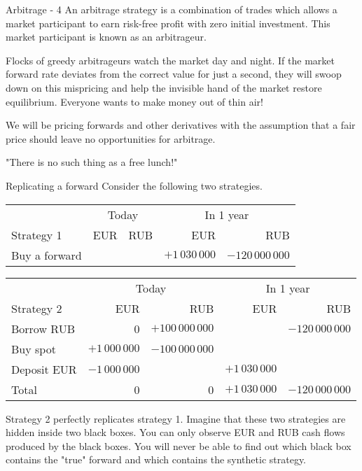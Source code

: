 \documentclass{beamer}
\begin{document}
\begin{frame}{Arbitrage - 4}
\justify
An \alert{arbitrage strategy} is a combination of trades which allows a market participant to earn risk-free profit with zero initial investment. This market participant is known as an \alert{arbitrageur}.

\justify
Flocks of greedy arbitrageurs watch the market day and night. If the market forward rate deviates from the correct value for just a second, they will swoop down on this mispricing and help the invisible hand of the market restore equilibrium. Everyone wants to make money out of thin air!

\justify
We will be pricing forwards and other derivatives with the assumption that a fair price should leave no opportunities for arbitrage.

\justify
"There is no such thing as a free lunch!"
\end{frame}



\begin{frame}{Replicating a forward}
\justify
Consider the following two strategies.

\justify
\small{
\begin{tabular}{l|r|r|r|r}
 & \multicolumn{2}{c|}{Today} & \multicolumn{2}{c}{In 1 year} \\ \cline{2-5}
Strategy  1& EUR & RUB & EUR & RUB \\ \hline
Buy a forward &                              &                                & $+1\,030\,000$ & $-120\,000\,000$
\end{tabular}
}

\justify
\small{
\begin{tabular}{l|r|r|r|r}
& \multicolumn{2}{c|}{Today} & \multicolumn{2}{c}{In 1 year} \\ \cline{2-5}
Strategy 2 & EUR & RUB & EUR & RUB \\ \hline
Borrow RUB & 0                            & $+100\,000\,000$ &                    & $-120\,000\,000$ \\
Buy spot        & $+1\,000\,000$ & $-100\,000\,000$  &                     &                                  \\
Deposit EUR & $-1\,000\,000$  &                                  & $+1\,030\,000$ & \\  \hline
Total & 0 & 0 &  $+1\,030\,000$ & $-120\,000\,000$
\end{tabular}
}

\justify
Strategy 2 perfectly \alert{replicates} strategy 1. Imagine that these two strategies are hidden inside two black boxes. You can only observe EUR and RUB cash flows produced by the black boxes. You will never be able to find out which black box contains the "true" forward and which contains the synthetic strategy.
\end{frame}
\end{document}
